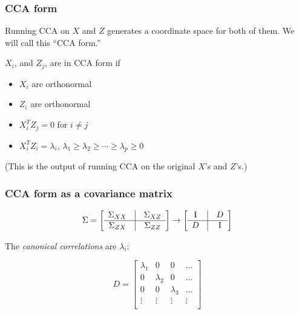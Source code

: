 \documentclass{beamer}
\begin{document}

\begin{frame}

\frametitle{CCA form}

Running CCA on $X$ and $Z$ generates a coordinate space for both of
them.  We will call this ``CCA form.''

\pause

\begin{definition} $X_i$, and $Z_j$, are in CCA form if
\begin{itemize}
\item $X_i$ are orthonormal
\item $Z_i$ are orthonormal
\item $X_i^T Z_j = 0$ for $i \ne j$
\item $X_i^T Z_i = \lambda_i$, $\lambda_1 \ge \lambda_2 \ge \cdots \ge
\lambda_p \ge 0$
\end{itemize}
\end{definition}

(This is the output of running CCA on the original $X$'s and $Z$'s.)

\end{frame}

\begin{frame}
	\frametitle{CCA form as a covariance matrix}

\Large
\[
\Sigma =\left[ 
\begin{array}{ccc}
\Sigma_{XX} &  \vline & \Sigma_{XZ} \\
\hline 
\Sigma_{ZX} & \vline & \Sigma_{ZZ}
\end{array}
\right]
\rightarrow
\left[ 
\begin{array}{ccc}
\textrm{I} &  \vline & D \\
\hline 
D & \vline & \textrm{I}
\end{array}
\right]
\]
\normalsize

The \emph{canonical correlations} are $\lambda_i$:

\large
\[
D =\left[ 
\begin{array}{cccc}
\lambda_1 &  0 & 0 & \ldots \\
0 & \lambda_2& 0 & \ldots \\
0 & 0 & \lambda_3 & \ldots \\
\vdots & \vdots & \vdots & \vdots \\
\end{array}
\right]
\]
\normalsize


\end{frame}
\end{document}
